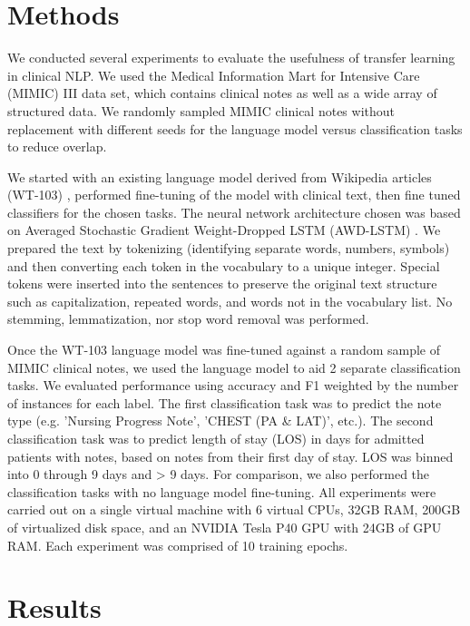 \documentclass{amia}
\begin{document}
\section*{Methods}

We conducted several experiments to evaluate the usefulness of transfer learning in clinical NLP. We used the Medical Information Mart for Intensive Care (MIMIC) III \cite{johnson_mimic-iii_2016} data set, which contains clinical notes as well as a wide array of structured data. We randomly sampled MIMIC clinical notes without replacement with different seeds for the language model versus classification tasks to reduce overlap.

We started with an existing language model derived from Wikipedia articles (WT-103) \cite{Merity2016Sep}, performed fine-tuning of the model with clinical text, then fine tuned classifiers for the chosen tasks. The neural network architecture chosen was based on Averaged Stochastic Gradient Weight-Dropped LSTM (AWD-LSTM) \cite{Merity2017Aug}. We prepared the text by tokenizing (identifying separate words, numbers, symbols) and then converting each token in the vocabulary to a unique integer. Special tokens were inserted into the sentences to preserve the original text structure such as capitalization, repeated words, and words not in the vocabulary list. No stemming, lemmatization, nor stop word removal was performed.

Once the WT-103 language model was fine-tuned against a random sample of MIMIC clinical notes, we used the language model to aid 2 separate classification tasks. We evaluated performance using accuracy and F1 weighted by the number of instances for each label. The first classification task was to predict the note type (e.g. 'Nursing Progress Note', 'CHEST (PA \& LAT)', etc.). The second classification task was to predict length of stay (LOS) in days for admitted patients with notes, based on notes from their first day of stay. LOS was binned into 0 through 9 days and > 9 days. For comparison, we also performed the classification tasks with no language model fine-tuning. All experiments were carried out on a single virtual machine with 6 virtual CPUs, 32GB RAM, 200GB of virtualized disk space, and an NVIDIA Tesla P40 GPU with 24GB of GPU RAM. Each experiment was comprised of 10 training epochs.

\section*{Results}
\end{document}

